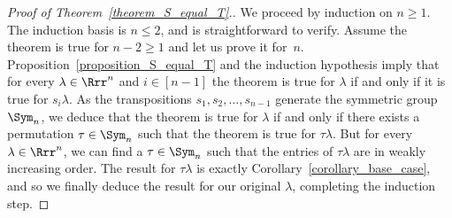 \begin{proof}[Proof of Theorem~\ref{theorem_S_equal_T}.]
We proceed by induction on $n \geq 1$.
The induction basis is $n \leq 2$, and is straightforward to verify.
Assume the theorem is true for $n-2 \geq 1$ and let us prove it for~$n$.
Proposition~\ref{proposition_S_equal_T} and the induction hypothesis imply that for
every $\lambda \in \Rrr^{n}$ and $i \in [n-1]$ 
the theorem is true for $\lambda$
if and only if it is true for $s_{i}\lambda$.
As the transpositions $s_{1}, s_{2}, \ldots, s_{n-1}$
generate the symmetric group $\Sym_{n}$, we deduce 
that the theorem is true for
$\lambda$ if and only if there exists 
a permutation $\tau\in\Sym_{n}$ such that the theorem is
true for $\tau\lambda$.
But for every $\lambda \in \Rrr^{n}$, we can find a $\tau \in \Sym_{n}$
such that the entries of $\tau\lambda$ are in weakly increasing order. 
The
result for $\tau\lambda$ is exactly Corollary~\ref{corollary_base_case}, and so we
finally deduce the result for our original $\lambda$,
completing the induction step.
\end{proof}
